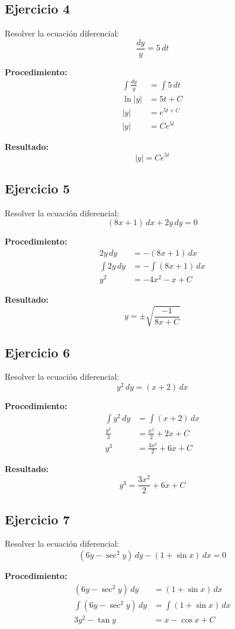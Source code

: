 \documentclass[12pt]{article}
\begin{document}
\subsection*{Ejercicio 4}
Resolver la ecuación diferencial:
\[
\frac{dy}{y} = 5\,dt
\]

\textbf{Procedimiento:}
\begin{align*}
\int \frac{dy}{y} &= \int 5\,dt \\
\ln|y| &= 5t + C \\
|y| &= e^{5t + C} \\
|y| &= Ce^{5t}
\end{align*}

\textbf{Resultado:}
\[
|y| = Ce^{5t}
\]

\subsection*{Ejercicio 5}
Resolver la ecuación diferencial:
\[
(8x + 1)\,dx + 2y\,dy = 0
\]

\textbf{Procedimiento:}
\begin{align*}
2y\,dy &= -(8x + 1)\,dx \\
\int 2y\,dy &= -\int (8x + 1)\,dx \\
y^2 &= -4x^2 - x + C
\end{align*}

\textbf{Resultado:}
\[
y = \pm\sqrt{\frac{-1}{8x + C}}
\]

\subsection*{Ejercicio 6}
Resolver la ecuación diferencial:
\[
y^2\,dy = (x + 2)\,dx
\]

\textbf{Procedimiento:}
\begin{align*}
\int y^2\,dy &= \int (x + 2)\,dx \\
\frac{y^3}{3} &= \frac{x^2}{2} + 2x + C \\
y^3 &= \frac{3x^2}{2} + 6x + C
\end{align*}

\textbf{Resultado:}
\[
y^3 = \frac{3x^2}{2} + 6x + C
\]

\subsection*{Ejercicio 7}
Resolver la ecuación diferencial:
\[
(6y - \sec^2 y)\,dy - (1 + \sin x)\,dx = 0
\]

\textbf{Procedimiento:}
\begin{align*}
(6y - \sec^2 y)\,dy &= (1 + \sin x)\,dx \\
\int (6y - \sec^2 y)\,dy &= \int (1 + \sin x)\,dx \\
3y^2 - \tan y &= x - \cos x + C
\end{align*}
\end{document}
